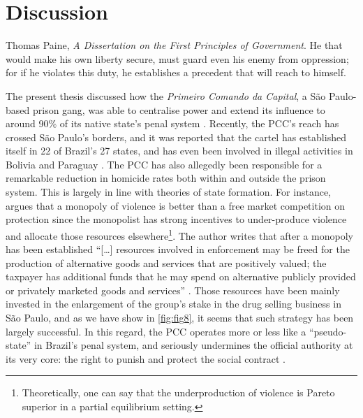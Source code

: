 \chapter{Discussion}
\label{ch:chap5}


\begin{chapquote}{Thomas Paine, \textit{A Dissertation on the First Principles of Government}.}
He that would make his own liberty secure, must guard even his enemy from oppression; for if he violates this duty, he establishes a precedent that will reach to himself.
\end{chapquote}


The present thesis discussed how the \textit{Primeiro Comando da Capital}, a S\~{a}o Paulo-based prison gang, was able to centralise power and extend its influence to around 90\% of its native state's penal system \citep[]{veja2013}. Recently, the PCC's reach has crossed S\~{a}o Paulo's borders, and it was reported that the cartel has established itself in 22 of Brazil's 27 states, and has even been involved in illegal activities in Bolivia and Paraguay \citep[]{bbc2013pcc}. The PCC has also allegedly been responsible for a remarkable reduction in homicide rates both within and outside the prison system. This is largely in line with theories of state formation. For instance, \citet{buchanan1973defense} argues that a monopoly of violence is better than a free market competition on protection since the monopolist has strong incentives to under-produce violence and allocate those resources elsewhere\footnote{Theoretically, one can say that the underproduction of violence is Pareto superior in a partial equilibrium setting.}. The author writes that after a monopoly has been established ``[\dots] resources involved in enforcement may be freed for the  production of alternative goods and services that are positively valued; the taxpayer has additional funds that he may spend on alternative publicly provided or privately marketed goods and services'' \citep[402]{buchanan1973defense}. Those resources have been mainly invested in the enlargement of the group's stake in the drug selling business in S\~{a}o Paulo, and as we have show in \autoref{fig:fig8}, it seems that such strategy has been largely successful. In this regard, the PCC operates more or less like a ``pseudo-state'' in Brazil's penal system, and seriously undermines the official authority at its very core: the right to punish and protect the social contract \citep[]{hobbes1985leviathan,weber1919politik}.

